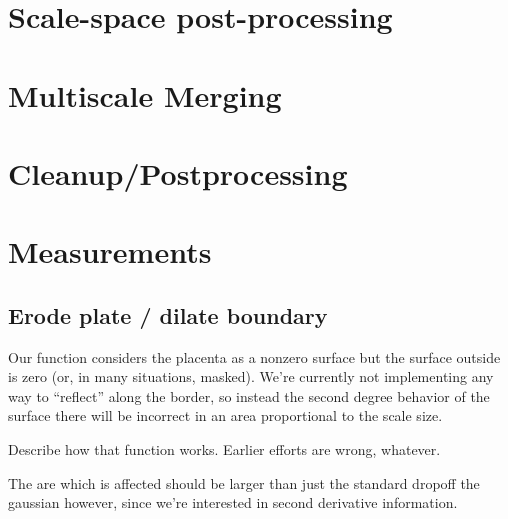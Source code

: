 \section{Scale-space post-processing}
\section{Multiscale Merging}
\section{Cleanup/Postprocessing}
\section{Measurements}

	\subsection{Erode plate / dilate boundary}
	
	Our function considers the placenta as a nonzero surface but the surface outside is zero (or, in many situations, masked). We're currently not implementing any way to ``reflect'' along the border, so instead the second degree behavior of the surface there will be incorrect in an area proportional to the scale size.
	
	Describe how that function works. Earlier efforts are wrong, whatever.
	
	The are which is affected should be larger than just the standard dropoff the gaussian however, since we're interested
	in second derivative information.

